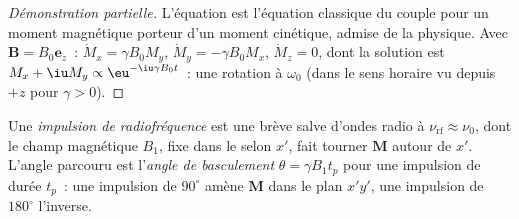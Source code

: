 \begin{proof}[Démonstration partielle]
L'équation est l'équation classique du couple pour un moment magnétique
porteur d'un moment cinétique, admise de la physique. Avec
$\mathbf B = B_0\mathbf e_z$~: $\dot M_x = \gamma
B_0M_y$, $\dot M_y = -\gamma B_0M_x$, $\dot M_z = 0$, dont la solution est $M_x + \iu M_y \propto
\eu^{-\iu\gamma B_0t}$~: une rotation à $\omega_0$ (dans le sens horaire
vu depuis $+z$ pour $\gamma > 0$).
\end{proof}

\begin{definition}\label{def:b3:advanced-nmr:pulse}
Une \emph{impulsion de radiofréquence} est une
brève salve d'ondes radio à $\nu_{\mathrm{rf}} \approx \nu_0$, dont le
champ magnétique $B_1$, fixe dans le  selon $x'$,
fait tourner $\mathbf M$ autour de $x'$. L'angle parcouru est
l'\emph{angle de basculement} $\theta = \gamma B_1t_p$
pour une impulsion de durée
$t_p$~: une impulsion de $90^\circ$ amène $\mathbf M$ dans le plan $x'y'$,
une impulsion de $180^\circ$ l'inverse.
\end{definition}

